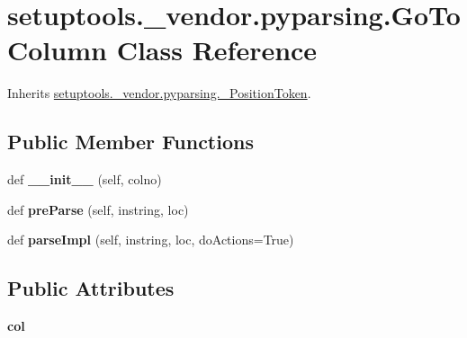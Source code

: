\hypertarget{classsetuptools_1_1__vendor_1_1pyparsing_1_1_go_to_column}{}\section{setuptools.\+\_\+vendor.\+pyparsing.\+Go\+To\+Column Class Reference}
\label{classsetuptools_1_1__vendor_1_1pyparsing_1_1_go_to_column}


Inherits \hyperlink{classsetuptools_1_1__vendor_1_1pyparsing_1_1___position_token}{setuptools.\+\_\+vendor.\+pyparsing.\+\_\+\+Position\+Token}.

\subsection*{Public Member Functions}
\begin{DoxyCompactItemize}
\item 
\mbox{\label{classsetuptools_1_1__vendor_1_1pyparsing_1_1_go_to_column_a008f076cf04ec72516511c95102b2be7}} 
def {\bfseries \+\_\+\+\_\+init\+\_\+\+\_\+} (self, colno)
\item 
\mbox{\label{classsetuptools_1_1__vendor_1_1pyparsing_1_1_go_to_column_aaad80f703431014740cde9a81e8c429b}} 
def {\bfseries pre\+Parse} (self, instring, loc)
\item 
\mbox{\label{classsetuptools_1_1__vendor_1_1pyparsing_1_1_go_to_column_ad0313c1890945d712e32732ade4de837}} 
def {\bfseries parse\+Impl} (self, instring, loc, do\+Actions=True)
\end{DoxyCompactItemize}
\subsection*{Public Attributes}
\begin{DoxyCompactItemize}
\item 
\mbox{\label{classsetuptools_1_1__vendor_1_1pyparsing_1_1_go_to_column_a206e08317a2119283a789c01645505d9}} 
{\bfseries col}
\end{DoxyCompactItemize}
